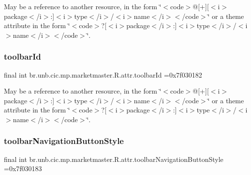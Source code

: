 May be a reference to another resource, in the form \char`\"{}$<$code$>$@\mbox{[}+\mbox{]}\mbox{[}$<$i$>$package$<$/i$>$\+:\mbox{]}$<$i$>$type$<$/i$>$/$<$i$>$name$<$/i$>$$<$/code$>$\char`\"{} or a theme attribute in the form \char`\"{}$<$code$>$?\mbox{[}$<$i$>$package$<$/i$>$\+:\mbox{]}$<$i$>$type$<$/i$>$/$<$i$>$name$<$/i$>$$<$/code$>$\char`\"{}. \mbox{\label{classbr_1_1unb_1_1cic_1_1mp_1_1marketmaster_1_1R_1_1attr_ae73648522ec7761fc26e7b4f6e7991b3}} 
\subsubsection{\texorpdfstring{toolbar\+Id}{toolbarId}}
{\footnotesize\ttfamily final int br.\+unb.\+cic.\+mp.\+marketmaster.\+R.\+attr.\+toolbar\+Id =0x7f030182\hspace{0.3cm}{\ttfamily [static]}}

May be a reference to another resource, in the form \char`\"{}$<$code$>$@\mbox{[}+\mbox{]}\mbox{[}$<$i$>$package$<$/i$>$\+:\mbox{]}$<$i$>$type$<$/i$>$/$<$i$>$name$<$/i$>$$<$/code$>$\char`\"{} or a theme attribute in the form \char`\"{}$<$code$>$?\mbox{[}$<$i$>$package$<$/i$>$\+:\mbox{]}$<$i$>$type$<$/i$>$/$<$i$>$name$<$/i$>$$<$/code$>$\char`\"{}. \mbox{\label{classbr_1_1unb_1_1cic_1_1mp_1_1marketmaster_1_1R_1_1attr_aba3523c01be71d077f5388eb3f67dc9b}} 
\subsubsection{\texorpdfstring{toolbar\+Navigation\+Button\+Style}{toolbarNavigationButtonStyle}}
{\footnotesize\ttfamily final int br.\+unb.\+cic.\+mp.\+marketmaster.\+R.\+attr.\+toolbar\+Navigation\+Button\+Style =0x7f030183\hspace{0.3cm}{\ttfamily [static]}}

